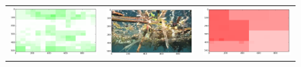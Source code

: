 \begin{figure}
\begin{tabular}{ccc}
\includegraphics[keepaspectratio=true,width=\segwidth]{images/segment/4409_01__animals__.png} &
\includegraphics[keepaspectratio=true,width=\segwidth]{images/segment/4409_01__image__.png} &
\includegraphics[keepaspectratio=true,width=\segwidth]{images/segment/4409_01__plastic__.png} \\


\end{tabular}
\end{figure}

